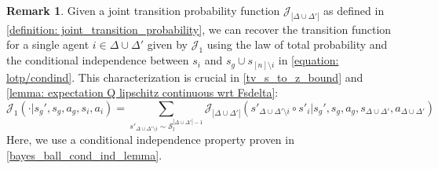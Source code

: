 \documentclass{article}
\theoremstyle{plain}
\theoremstyle{definition}
\newtheorem{remark}[theorem]{Remark}
\begin{document}
\begin{remark}
    Given a joint transition probability function $\mathcal{J}_{|\Delta\cup\Delta'|}$ as defined in \cref{definition: joint_transition_probability}, we can recover the transition function for a single agent $i\in \Delta\cup\Delta'$ given by $\mathcal{J}_1$ using the law of total probability and the conditional independence between $s_i$ and $s_g\cup s_{[n]\setminus i}$ in \cref{equation: lotp/condind}. This characterization is crucial in  \cref{tv_s_to_z_bound} and \cref{lemma: expectation Q lipschitz continuous wrt Fsdelta}: 
    \begin{equation}
        \label{equation: lotp/condind}\mathcal{J}_1(\cdot|s_g',s_g, a_g, s_i,a_i) = \sum_{s'_{\Delta\cup\Delta'\setminus i}\sim \mathcal{S}_l^{|\Delta\cup\Delta'|-1}}\mathcal{J}_{|\Delta\cup\Delta'|}(s'_{\Delta\cup\Delta'\setminus i}\circ s'_i|s_g',s_g,a_g,s_{\Delta\cup\Delta'},a_{\Delta\cup\Delta'})
    \end{equation}
Here, we use a conditional independence property proven in  \cref{bayes_ball_cond_ind_lemma}.\\
\end{remark}
\end{document}
